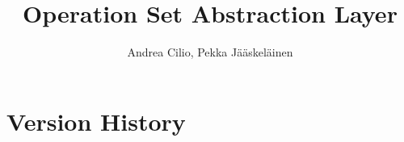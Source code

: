 \documentclass[twoside]{tce}
\begin{document}
\author{Andrea Cilio, Pekka J\"a\"askel\"ainen}
\title{Operation Set Abstraction Layer}
\maketitle

\newcommand{\parm}[1]{\textsl{#1\/}}

\newcommand{\xmltag}[1]{\texttt{<#1>}}
\newcommand{\xmlelem}[2]{\texttt{<#1> #2 </#1>}}
\newcommand{\xmlaelem}[3]{\texttt{<#1 #2> #3 </#1>}}

\chapter*{Version History}
\end{document}
